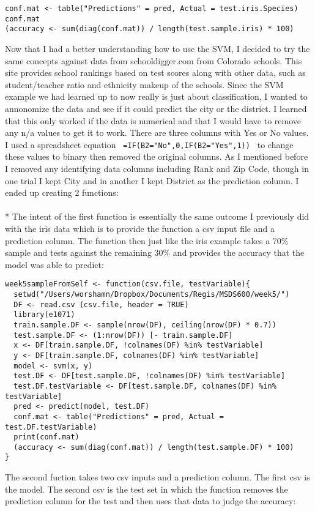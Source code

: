 \documentclass[10pt]{article}
\begin{document}
\begin{verbatim}
conf.mat <- table("Predictions" = pred, Actual = test.iris.Species) 
conf.mat 
(accuracy <- sum(diag(conf.mat)) / length(test.sample.iris) * 100) 
\end{verbatim}
Now that I had a better understanding how to use the SVM, I decided to try the same concepts against data from schooldigger.com from Colorado schools. This site provides school rankings based on test scores along with other data, such as student/teacher ratio and ethnicity makeup of the schools. Since the SVM example we had learned up to now really is just about classification, I wanted to annonomize the data and see if it could predict the city or the district. I learned that this only worked if the data is numerical and that I would have to remove any n/a values to get it to work. There are three columns with Yes or No values. I used a spreadsheet equation \verb| =IF(B2="No",0,IF(B2="Yes",1)) | to change these values to binary then removed the original columns. As I mentioned before I removed any identifying data columns including Rank and Zip Code, though in one trial I kept City and in another I kept District as the prediction column. I ended up creating 2 functions:
\\
\\*
The intent of the first function is essentially the same outcome I previously did with the iris data which is to provide the function a csv input file and a prediction column. The function then just like the iris example takes a 70\% sample and tests against the remaining 30\% and provides the accuracy that the model was able to predict:
\begin{verbatim}
week5sampleFromSelf <- function(csv.file, testVariable){
  setwd("/Users/worshamn/Dropbox/Documents/Regis/MSDS600/week5/")
  DF <- read.csv (csv.file, header = TRUE)
  library(e1071)
  train.sample.DF <- sample(nrow(DF), ceiling(nrow(DF) * 0.7))
  test.sample.DF <- (1:nrow(DF)) [- train.sample.DF]
  x <- DF[train.sample.DF, !colnames(DF) %in% testVariable]
  y <- DF[train.sample.DF, colnames(DF) %in% testVariable]
  model <- svm(x, y)
  test.DF <- DF[test.sample.DF, !colnames(DF) %in% testVariable]
  test.DF.testVariable <- DF[test.sample.DF, colnames(DF) %in% testVariable]
  pred <- predict(model, test.DF)
  conf.mat <- table("Predictions" = pred, Actual = test.DF.testVariable)
  print(conf.mat)
  (accuracy <- sum(diag(conf.mat)) / length(test.sample.DF) * 100)
}
\end{verbatim}
The second fuction takes two csv inputs and a prediction column. The first csv is the model. The second csv is the test set in which the function removes the prediction column for the test and then uses that data to judge the accuracy:
\end{document}
